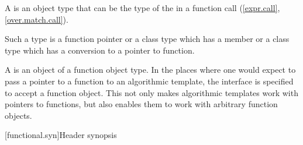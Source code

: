 \pnum
A  is an object
type that can be the type of the
 in a function call
(\ref{expr.call}, \ref{over.match.call}).
\begin{footnote}
Such a type is a function
pointer or a class type which has a member  or a class type
which has a conversion to a pointer to function.
\end{footnote}
A  is an
object of a function object type. In the places where one would expect to pass a
pointer to a function to an algorithmic template, the
interface is specified to accept a function object. This not only makes
algorithmic templates work with pointers to functions, but also enables them to
work with arbitrary function objects.

[functional.syn]{Header  synopsis}

